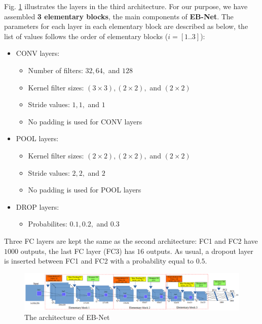 \documentclass[review]{elsarticle}
\begin{document}
Fig. \ref{fignet3} illustrates the layers in the third architecture. For our purpose, we have assembled \textbf{3 elementary blocks}, the main components of \textbf{EB-Net}. The parameters for each layer in each elementary block are described as below, the list of values follows the order of elementary blocks ($i = [1..3]$):
\begin{itemize}
	\item CONV layers:
	\begin{itemize}
		\item Number of filters: $32, 64, $ and $128$
		\item Kernel filter sizes: $(3 \times 3), (2 \times 2), $ and $(2 \times 2)$
		\item Stride values: $1, 1, $ and $1$
		\item No padding is used for CONV layers 
	\end{itemize}
	\item POOL layers:
		\begin{itemize}
			\item Kernel filter sizes: $(2 \times 2), (2 \times 2), $ and $(2 \times 2)$
			\item Stride values: $2, 2, $ and $2$
			\item No padding is used for POOL layers
		\end{itemize}
	\item DROP layers:
		\begin{itemize}
			\item Probabilites: $0.1, 0.2, $ and $0.3$
		\end{itemize}
\end{itemize}

Three FC layers are kept the same as the second architecture: FC1 and FC2 have $1000$ outputs, the last FC layer (FC3) has $16$ outputs. As usual, a dropout layer is inserted between FC1 and FC2 with a probability equal to $0.5$.
\begin{figure}[h]
	\centering
	\includegraphics[scale=0.3]{images/net3}
	\caption{The architecture of EB-Net}
	\label{fignet3}
\end{figure}
\end{document}
